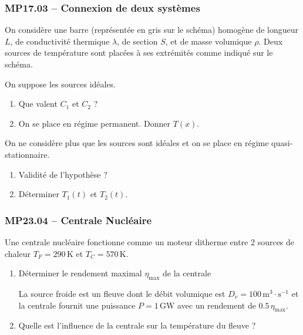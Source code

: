 \subsubsection*{MP17.03 -- Connexion de deux systèmes  \corrige}

On considère une barre (représentée en gris sur le schéma) homogène de longueur $L$, de conductivité thermique $\lambda$, de section $S$, et de masse volumique $\rho$. Deux sources de température sont placées à ses extrémités comme indiqué sur le schéma.

\begin{center}
\end{center}

On suppose les sources idéales.

\begin{enumerate}
\item Que valent $C_{1}$ et $C_{2}$ ?
\item On se place en régime permanent. Donner $T(x)$.
\end{enumerate}

On ne considère plus que les sources sont idéales et on se place en régime quasi-stationnaire.
\begin{enumerate}[resume]
\item Validité de l'hypothèse ?
\item Déterminer $T_1(t)$ et $T_2(t)$.
\end{enumerate}

\newpage
\subsubsection*{MP23.04 -- Centrale Nucléaire }

Une centrale nucléaire fonctionne comme un moteur ditherme entre 2 sources de chaleur $T_{F} = 290\,\text{K}$ et $T_{C} = 570\,\text{K}$.

\begin{enumerate}
\item Déterminer le rendement maximal $\eta_{\max}$ de la centrale

La source froide est un fleuve dont le débit volumique est $D_{v} = 100\,\text{m}^{3}\cdot\text{s}^{-1}$ et la centrale fournit une puissance $P = 1\,\text{GW}$ avec un rendement de $0.5\,\eta_{\max}$.

\item Quelle est l'influence de la centrale sur la température du fleuve ?
\end{enumerate}

